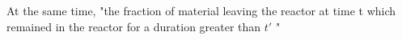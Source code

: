 At the same time, "the fraction of material leaving the reactor at time t which remained in the reactor for a duration greater than $t'$ "  